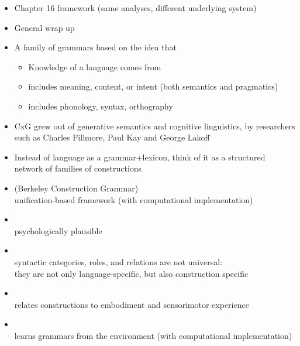 \documentclass[a4paper,landscape,headrule,footrule,dvips]{foils}
\begin{document}
\avmfont{\it}
\maketitle





\begin{itemize}
\item Chapter 16 framework (same analyses, 
different underlying system)
\item General wrap up
\end{itemize}


\begin{itemize}
\item A family of grammars based on the idea that
  \begin{itemize}
  \item Knowledge of a language comes from 
  \item {} includes meaning, content, or intent 
    (both semantics and pragmatics)
  \item {} includes phonology, syntax, orthography
  \end{itemize}
\item CxG grew out of generative semantics and cognitive linguistics,
  by researchers such as Charles Fillmore, Paul Kay and George Lakoff
\item Instead of language as a grammar+lexicon, think of it as a
  structured network of families of constructions
\end{itemize}


\begin{itemize}
\item {} (Berkeley Construction Grammar)
  \\  unification-based framework (with computational implementation)
\item {}
  \\ psychologically plausible
\item {}
  \\ syntactic categories, roles, and relations are not universal: 
  \\ they are not only language-specific, but also construction specific 
\item {}
  \\ relates constructions to embodiment and sensorimotor experience
\item {}
  \\ learns grammars from the environment (with computational implementation)
\end{itemize}
\end{document}
